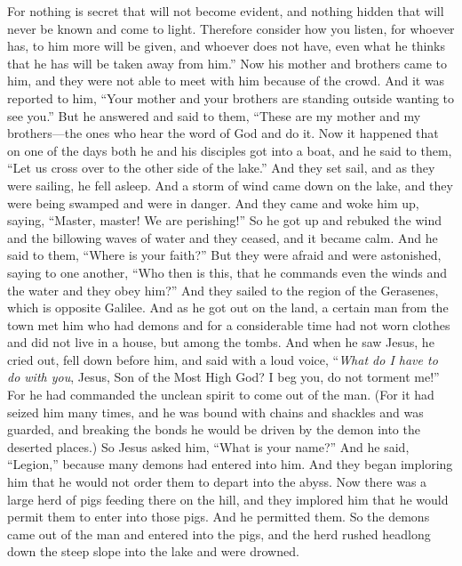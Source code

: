 \begin{biblechapter}
\verse For nothing is secret that will not become evident, and nothing hidden that will never be known and come to light.
\verse Therefore consider how you listen, for whoever has, to him more will be given, and whoever does not have, even what he thinks that he has will be taken away from him.”
 Now his mother and brothers came to him, and they were not able to meet with him because of the crowd.
\verse And it was reported to him, “Your mother and your brothers are standing outside wanting to see you.”
\verse But he answered and said to them, “These are my mother and my brothers—the ones who hear the word of God and do it.
 Now it happened that on one of the days both he and his disciples got into a boat, and he said to them, “Let us cross over to the other side of the lake.” And they set sail,
\verse and as they were sailing, he fell asleep. And a storm of wind came down on the lake, and they were being swamped and were in danger.
\verse And they came and woke him up, saying, “Master, master! We are perishing!” So he got up and rebuked the wind and the billowing waves of water and they ceased, and it became calm.
\verse And he said to them, “Where is your faith?” But they were afraid and were astonished, saying to one another, “Who then is this, that he commands even the winds and the water and they obey him?”
 And they sailed to the region of the Gerasenes, which is opposite Galilee.
\verse And as he got out on the land, a certain man from the town met him who had demons and for a considerable time had not worn clothes and did not live in a house, but among the tombs.
\verse And when he saw Jesus, he cried out, fell down before him, and said with a loud voice, “\textit{What do I have to do with you}, Jesus, Son of the Most High God? I beg you, do not torment me!”
\verse For he had commanded the unclean spirit to come out of the man. (For it had seized him many times, and he was bound with chains and shackles and was guarded, and breaking the bonds he would be driven by the demon into the deserted places.)
\verse So Jesus asked him, “What is your name?” And he said, “Legion,” because many demons had entered into him.
\verse And they began imploring him that he would not order them to depart into the abyss.
\verse Now there was a large herd of pigs feeding there on the hill, and they implored him that he would permit them to enter into those pigs. And he permitted them.
\verse So the demons came out of the man and entered into the pigs, and the herd rushed headlong down the steep slope into the lake and were drowned.

\end{biblechapter}
